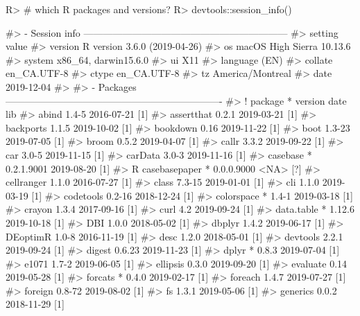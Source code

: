 \documentclass[
]{jss}
\begin{document}
\begin{CodeChunk}

\begin{CodeInput}
R> # which R packages and versions?
R> devtools::session_info()
\end{CodeInput}

\begin{CodeOutput}
#> - Session info ---------------------------------------------------------------
#>  setting  value                       
#>  version  R version 3.6.0 (2019-04-26)
#>  os       macOS High Sierra 10.13.6   
#>  system   x86_64, darwin15.6.0        
#>  ui       X11                         
#>  language (EN)                        
#>  collate  en_CA.UTF-8                 
#>  ctype    en_CA.UTF-8                 
#>  tz       America/Montreal            
#>  date     2019-12-04                  
#> 
#> - Packages -------------------------------------------------------------------
#>  ! package       * version    date       lib
#>    abind           1.4-5      2016-07-21 [1]
#>    assertthat      0.2.1      2019-03-21 [1]
#>    backports       1.1.5      2019-10-02 [1]
#>    bookdown        0.16       2019-11-22 [1]
#>    boot            1.3-23     2019-07-05 [1]
#>    broom           0.5.2      2019-04-07 [1]
#>    callr           3.3.2      2019-09-22 [1]
#>    car             3.0-5      2019-11-15 [1]
#>    carData         3.0-3      2019-11-16 [1]
#>    casebase      * 0.2.1.9001 2019-08-20 [1]
#>  R casebasepaper * 0.0.0.9000 <NA>       [?]
#>    cellranger      1.1.0      2016-07-27 [1]
#>    class           7.3-15     2019-01-01 [1]
#>    cli             1.1.0      2019-03-19 [1]
#>    codetools       0.2-16     2018-12-24 [1]
#>    colorspace    * 1.4-1      2019-03-18 [1]
#>    crayon          1.3.4      2017-09-16 [1]
#>    curl            4.2        2019-09-24 [1]
#>    data.table    * 1.12.6     2019-10-18 [1]
#>    DBI             1.0.0      2018-05-02 [1]
#>    dbplyr          1.4.2      2019-06-17 [1]
#>    DEoptimR        1.0-8      2016-11-19 [1]
#>    desc            1.2.0      2018-05-01 [1]
#>    devtools        2.2.1      2019-09-24 [1]
#>    digest          0.6.23     2019-11-23 [1]
#>    dplyr         * 0.8.3      2019-07-04 [1]
#>    e1071           1.7-2      2019-06-05 [1]
#>    ellipsis        0.3.0      2019-09-20 [1]
#>    evaluate        0.14       2019-05-28 [1]
#>    forcats       * 0.4.0      2019-02-17 [1]
#>    foreach         1.4.7      2019-07-27 [1]
#>    foreign         0.8-72     2019-08-02 [1]
#>    fs              1.3.1      2019-05-06 [1]
#>    generics        0.0.2      2018-11-29 [1]

\end{CodeOutput}
\end{CodeChunk}
\end{document}

